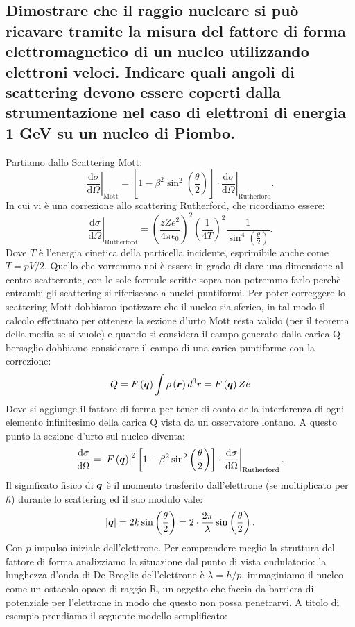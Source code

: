 \subsection[]{Dimostrare che il raggio nucleare si può ricavare tramite la misura del fattore di forma elettromagnetico di un nucleo utilizzando elettroni veloci. Indicare quali angoli di scattering devono essere coperti dalla strumentazione nel caso di elettroni di energia 1 GeV su un nucleo di Piombo.}%
\label{sec:5.c.36}
Partiamo dallo Scattering Mott:
\[
	\left.\frac{\mbox{d}\sigma }{\mbox{d} \Omega} \right|_{\text{Mott}} = 
		\left[ 1- \beta^2 \sin^2\left( \frac{\theta}{2} \right) \right]\cdot \left.\frac{\mbox{d} \sigma}{\mbox{d} \Omega} \right|_{\text{Rutherford}} 
.\] 
In cui vi è una correzione allo scattering Rutherford, che ricordiamo essere:
\[
	\left.\frac{\mbox{d} \sigma}{\mbox{d} \Omega} \right|_{\text{Rutherford}}= \left( \frac{zZe^2}{4\pi\epsilon_0} \right)^2\left( \frac{1}{4T} \right)^2 
		\frac{1}{\sin^4\left( \frac{\theta}{2} \right) }
.\] 
Dove $T$ è l'energia cinetica della particella incidente, esprimibile anche come $T = pV /2$.
Quello che vorremmo noi è essere in grado di dare una dimensione al centro scatterante, con le sole formule scritte sopra non potremmo farlo perchè entrambi gli scattering si riferiscono a nuclei puntiformi. Per poter correggere lo scattering Mott dobbiamo ipotizzare che il nucleo sia sferico, in tal modo il calcolo effettuato per ottenere la sezione d'urto Mott resta valido (per il teorema della media se si vuole) e quando si considera il campo generato dalla carica Q bersaglio dobbiamo considerare il campo di una carica puntiforme con la correzione: 
\[
	Q = F\left(\boldsymbol{q}\right)\int\rho\left(\boldsymbol{r}\right)d^3r = F\left(\boldsymbol{q}\right) Ze 
\]
Dove si aggiunge il fattore di forma per tener di conto della interferenza di ogni elemento infinitesimo della carica Q vista da un osservatore lontano. A questo punto la sezione d'urto sul nucleo diventa:
\[
	\frac{\mbox{d} \sigma}{\mbox{d} \Omega} =
		\left| F\left( \boldsymbol{q} \right)  \right|^2\left[ 1- \beta^2\sin^2\left( \frac{\theta}{2} \right)  \right]
		\cdot \left.\frac{\mbox{d} \sigma}{\mbox{d} \Omega} \right|_{\text{Rutherford}}
.\] 
Il significato fisico di $\boldsymbol{q}$ è il momento trasferito dall'elettrone (se moltiplicato per $\hbar$) durante lo scattering ed il suo modulo vale:
\[
	\left|\boldsymbol{q}\right|= 2k\sin\left(\frac{\theta}{2}\right)= 2\cdot \frac{2\pi}{\lambda}\sin\left( \frac{\theta}{2} \right) 
.\] 
Con $p$ impulso iniziale dell'elettrone. Per comprendere meglio la struttura del fattore di forma analizziamo la situazione dal punto di vista ondulatorio: la lunghezza d'onda di De Broglie dell'elettrone è $\lambda = h /p$, immaginiamo il nucleo come un ostacolo opaco di raggio R, un oggetto che faccia da barriera di potenziale per l'elettrone in modo che questo non possa penetrarvi. A titolo di esempio prendiamo il seguente modello semplificato:
